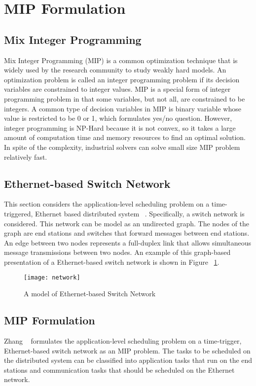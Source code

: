 \section{MIP Formulation} \label{mip}

\subsection{Mix Integer Programming}
Mix Integer Programming (MIP) is a common optimization technique that is widely used by the research community to study weakly hard models. An optimization problem is called an integer programming problem if its decision variables are constrained to integer values. MIP is a special form of integer programming problem in that some variables, but not all, are constrained to be integers. A common type of decision variables in MIP is binary variable whose value is restricted to be 0 or 1, which formulates yes/no question. However, integer programming is NP-Hard because it is not convex, so it takes a large amount of computation time and memory resources to find an optimal solution. In spite of the complexity, industrial solvers can solve small size MIP problem relatively fast. 

\subsection{Ethernet-based Switch Network}
This section considers the application-level scheduling problem on a time-triggered, Ethernet based distributed system ~\cite{Zhang2018SynthesizingCA}. Specifically, a switch network is considered. This network can be model as an undirected graph. The nodes of the graph are end stations and switches that forward messages between end stations. An edge between two nodes represents a full-duplex link that allows simultaneous message transmissions between two nodes. An example of this graph-based presentation of a Ethernet-based switch network is shown in Figure ~\ref{fig:network}.

\begin{figure}[h!]
\caption{A model of Ethernet-based Switch Network~\cite{Zhang2018SynthesizingCA}}
\centering
\texttt{[image: network]}
\label{fig:network}
\end{figure}

\subsection{MIP Formulation}
Zhang ~\cite{Zhang2018SynthesizingCA} formulates the application-level scheduling problem on a time-trigger, Ethernet-based switch network as an MIP problem. The tasks to be scheduled on the distributed system can be classified into application tasks that run on the end stations and communication tasks that should be scheduled on the Ethernet network. 

